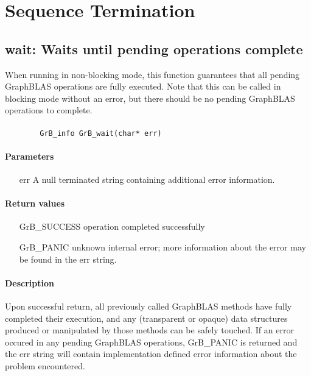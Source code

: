 \section{Sequence Termination}

\subsection{{\sf wait}: Waits until pending operations complete}
\label{Sec:wait}

When running in non-blocking mode, this function guarantees that all pending GraphBLAS operations are fully executed.  Note that this can be called in blocking mode without an error, but there should be no pending GraphBLAS operations to complete.

\paragraph{\syntax}

\begin{verbatim}
        GrB_info GrB_wait(char* err)
\end{verbatim}

\paragraph{Parameters}
\begin{itemize}[leftmargin=1.1in]
\item[{\sf err}]     A null terminated string containing additional error
information.
\end{itemize}


\paragraph{Return values}
\begin{itemize}[leftmargin=2.1in]
\item[{\sf GrB\_SUCCESS}]	operation completed successfully
\item[{\sf GrB\_PANIC}]		unknown internal error; more information about the error may be found in the {\sf err} string.
\end{itemize}

\paragraph{Description}

Upon successful return, all previously called GraphBLAS methods have fully completed their execution, and 
any (transparent or opaque) data structures produced or manipulated by those methods can be safely touched.  If an error occured in any pending GraphBLAS operations, {\sf GrB\_PANIC} is returned and the {\sf err} string will contain implementation defined error information about the problem encountered.

